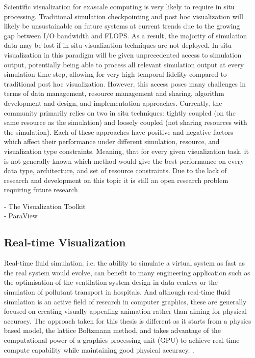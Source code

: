 Scientific visualization for exascale computing is very likely to require in situ processing. Traditional simulation checkpointing and post hoc visualization will likely be unsustainable on future systems at current trends due to the growing gap between I/O bandwidth and FLOPS. As a result, the majority of simulation data may be lost if in situ visualization techniques are not deployed. In situ visualization in this paradigm will be given unprecedented access to simulation output, potentially being able to process all relevant simulation output at every simulation time step, allowing for very high temporal fidelity compared to traditional post hoc visualization. However, this access poses many challenges in terms of data management, resource management and sharing, algorithm development and design, and implementation approaches. Currently, the community primarily relies on two in situ techniques: tightly coupled (on the same resource as the simulation) and loosely coupled (not sharing resources with the simulation). Each of these approaches have positive and negative factors which affect their performance under different simulation, resource, and visualization type constraints. Meaning, that for every given visualization task, it is not generally known which method would give the best performance on every data type, architecture, and set of resource constraints. Due to the lack of research and development on this topic it is still an open research problem requiring future research
\cite{Kepler2017InSV}

- The Visualization Toolkit \\
- ParaView \\


\subsection{Real-time Visualization}
\label{rt-viz}

Real-time fluid simulation, i.e. the ability to simulate a virtual system as fast as the real system would evolve, can benefit to many engineering application such as the optimisation of the ventilation system design in data centres or the simulation of pollutant transport in hospitals. And although real-time fluid simulation is an active field of research in computer graphics, these are generally focused on creating visually appealing animation rather than aiming for physical accuracy. The approach taken for this thesis is different as it starts from a physics based model, the lattice Boltzmann method, and takes advantage of the computational power of a graphics processing unit (GPU) to achieve real-time compute capability while maintaining good physical accuracy. \cite{delboscRealTimeSimulationIndoor}.

